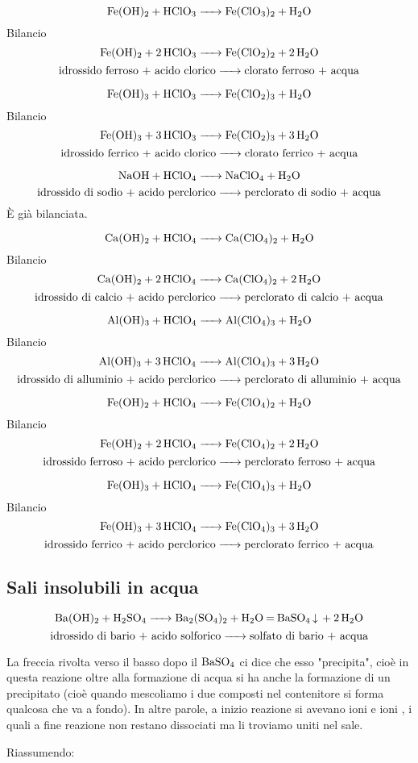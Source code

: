 $$\ce{Fe(OH)_2 + HClO_3 -> Fe(ClO_3)_2 + H_2O}$$Bilancio
$$\ce{Fe(OH)_2 + 2HClO_3 -> Fe(ClO_2)_2 + 2H_2O}$$
$$\text{idrossido ferroso + acido clorico}\ce{->}\text{clorato ferroso + acqua}$$

$$\ce{Fe(OH)_3 + HClO_3 -> Fe(ClO_2)_3 + H_2O}$$Bilancio
$$\ce{Fe(OH)_3 + 3 HClO_3 -> Fe(ClO_2)_3 + 3 H_2O}$$
$$\text{idrossido ferrico + acido clorico}\ce{->}\text{clorato ferrico + acqua}$$

$$\ce{NaOH + HClO_4 -> NaClO_4 + H_2O}$$
$$\text{idrossido di sodio + acido perclorico}\ce{->}\text{perclorato di sodio + acqua}$$
È già bilanciata.

$$\ce{Ca(OH)_2 + HClO_4 -> Ca(ClO_4)_2 + H_2O}$$Bilancio
$$\ce{Ca(OH)_2 + 2 HClO_4 -> Ca(ClO_4)_2 + 2 H_2O}$$
$$\text{idrossido di calcio + acido perclorico}\ce{->}\text{perclorato di calcio + acqua}$$

$$\ce{Al(OH)_3 + HClO_4 -> Al(ClO_4)_3 + H_2O}$$Bilancio
$$\ce{Al(OH)_3 + 3 HClO_4 -> Al(ClO_4)_3 + 3 H_2O}$$
$$\text{idrossido di alluminio + acido perclorico}\ce{->}\text{perclorato di alluminio + acqua}$$

$$\ce{Fe(OH)_2 + HClO_4 -> Fe(ClO_4)_2 + H_2O}$$Bilancio
$$\ce{Fe(OH)_2 + 2 HClO_4 -> Fe(ClO_4)_2 + 2 H_2O}$$
$$\text{idrossido ferroso + acido perclorico}\ce{->}\text{perclorato ferroso + acqua}$$

$$\ce{Fe(OH)_3 + HClO_4 -> Fe(ClO_4)_3 + H_2O}$$Bilancio
$$\ce{Fe(OH)_3 + 3 HClO_4 -> Fe(ClO_4)_3 + 3 H_2O}$$
$$\text{idrossido ferrico + acido perclorico}\ce{->}\text{perclorato ferrico + acqua}$$

\subsection{Sali insolubili in acqua}
$$\ce{Ba(OH)_2 + H_2SO_4 -> Ba_2(SO_4)_2 + H_2O = BaSO_4 v + 2H_2O}$$
$$\text{idrossido di bario + acido solforico}\ce{->}\text{solfato di bario + acqua}$$

La freccia rivolta verso il basso dopo il $\rm BaSO_4$ ci dice che esso "precipita", cioè in questa reazione oltre alla formazione di acqua si ha anche la formazione di un precipitato (cioè quando mescoliamo i due composti nel contenitore si forma qualcosa che va a fondo). In altre parole, a inizio reazione si avevano ioni  e ioni , i quali a fine reazione non restano dissociati ma li troviamo uniti nel sale.

\vspace{0.2cm}Riassumendo:

